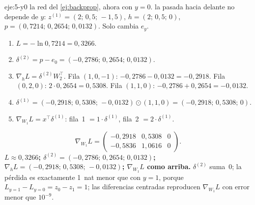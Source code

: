 \begin{solucion}{eje:5-y0}
\datos la red del \cref{ej:backprop}, ahora con $y=0$.
\planteamiento la pasada hacia delante no depende de $y$: $z^{(1)}=(2;\,0{,}5;\,-1{,}5)$, $h=(2;\,0{,}5;\,0)$, $p=(0{,}7214;\,0{,}2654;\,0{,}0132)$. Solo cambia $e_y$.
\pasos
\begin{enumerate}[label=\arabic*.]
  \item $L=-\ln 0{,}7214=0{,}3266$.
  \item $\delta^{(2)}=p-e_0=(-0{,}2786;\,0{,}2654;\,0{,}0132)$.
  \item $\nabla_{\!h}L=\delta^{(2)}W_2^{\top}$. Fila $(1,0,-1)$: $-0{,}2786-0{,}0132=-0{,}2918$. Fila $(0,2,0)$: $2\cdot 0{,}2654=0{,}5308$. Fila $(1,1,0)$: $-0{,}2786+0{,}2654=-0{,}0132$.
  \item $\delta^{(1)}=(-0{,}2918;\,0{,}5308;\,-0{,}0132)\odot(1,1,0)=(-0{,}2918;\,0{,}5308;\,0)$.
  \item $\nabla_{\!W_1}L=x^{\top}\delta^{(1)}$: fila~1 $=1\cdot\delta^{(1)}$, fila~2 $=2\cdot\delta^{(1)}$.
\end{enumerate}
\[
\nabla_{\!W_1}L=\begin{pmatrix}-0{,}2918&0{,}5308&0\\-0{,}5836&1{,}0616&0\end{pmatrix}.
\]
\resultado \textbf{$L\approx 0{,}3266$; $\delta^{(2)}=(-0{,}2786;\,0{,}2654;\,0{,}0132)$; $\nabla_{\!h}L=(-0{,}2918;\,0{,}5308;\,-0{,}0132)$; $\nabla_{\!W_1}L$ como arriba.}
\comprobacion $\delta^{(2)}$ suma~0; la pérdida es exactamente 1~nat menor que con $y=1$, porque $L_{y=1}-L_{y=0}=z_0-z_1=1$; las diferencias centradas reproducen $\nabla_{\!W_1}L$ con error menor que $10^{-9}$.
\end{solucion}

